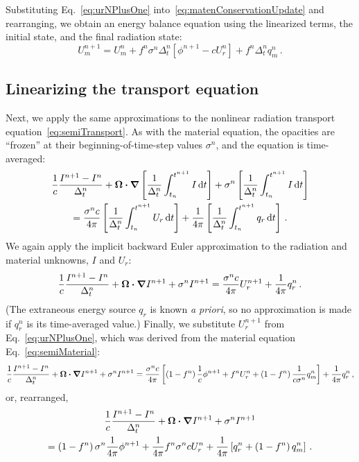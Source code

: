 Substituting Eq.~\eqref{eq:urNPlusOne} into~\eqref{eq:matenConservationUpdate}
and rearranging, we obtain an energy balance equation using the linearized
terms, the initial state, and the final radiation state:
\begin{equation}\label{eq:matenConservationUpdate2}
  U_m^{n+1} = U_m^n + f^n \sigma^n \Delta_t^n
  \left[ \phi^{n+1} - c U_r^n \right] + f^n \Delta_t^n q_m^n \,.
\end{equation}

\subsection{Linearizing the transport equation}
Next, we apply the same approximations to the nonlinear radiation
transport equation~\eqref{eq:semiTransport}. As with the material equation,
the
opacities are ``frozen'' at their beginning-of-time-step values $\sigma^n$, and
the equation is time-averaged:
\begin{multline*}
  \frac{1}{c} \frac{I^{n+1} - I^n}{\Delta_t^n}
  + \bm{\Omega} \bm{\cdot} \bm{\nabla} \left[
  \frac{1}{\Delta_t^n}\int_{t_n}^{t^{n+1}} I\mathop{}\!\mathrm{d} t
  \right] +
 \sigma^n \left[
  \frac{1}{\Delta_t^n}\int_{t_n}^{t^{n+1}} I\mathop{}\!\mathrm{d} t
  \right]
  \\
  = \frac{\sigma^n c}{4\pi} \left[
  \frac{1}{\Delta_t^n}\int_{t_n}^{t^{n+1}} U_r \mathop{}\!\mathrm{d} t \right]
  + \frac{1}{4\pi}\left[
  \frac{1}{\Delta_t^n}\int_{t_n}^{t^{n+1}} q_r \mathop{}\!\mathrm{d} t \right] \,.
\end{multline*}
We again apply the implicit backward Euler approximation
to the radiation and
material unknowns, $I$ and $U_r$:
\begin{equation*}
  \frac{1}{c} \frac{I^{n+1} - I^n}{\Delta_t^n}
  + \bm{\Omega} \bm{\cdot} \bm{\nabla} I^{n+1}
 + \sigma^n I^{n+1}
 = \frac{\sigma^n c}{4\pi} U_r^{n+1}
  + \frac{1}{4\pi} q_r^n \,.
\end{equation*}
(The extraneous energy source $q_r$ is known \emph{a priori}, so no
approximation is made if $q_r^n$ is its time-averaged value.)
Finally, we substitute $U_r^{n+1}$ from Eq.~\eqref{eq:urNPlusOne},
which was derived from the material equation Eq.~\eqref{eq:semiMaterial}:
\begin{equation*}
  \frac{1}{c} \frac{I^{n+1} - I^n}{\Delta_t^n}
  + \bm{\Omega} \bm{\cdot} \bm{\nabla} I^{n+1}
 + \sigma^n I^{n+1}
 = \frac{\sigma^n c}{4\pi} \left[ \left(1 - f^n\right) \frac1c \phi^{n+1}
   + f^n U_r^n
   + \left(1 - f^n\right)\frac{1}{c \sigma^n} q_m^n \right]
  + \frac{1}{4\pi} q_r^n\,,
\end{equation*}
or, rearranged,
\begin{multline}\label{eq:linearizedGrayTransport}
  \frac{1}{c} \frac{I^{n+1} - I^n}{\Delta_t^n}
  + \bm{\Omega} \bm{\cdot} \bm{\nabla} I^{n+1}
 + \sigma^n I^{n+1}
 \\
 =  \left(1 - f^n\right) \sigma^n \frac{1}{4\pi} \phi^{n+1}
 + \frac{1}{4\pi} f^n \sigma^n c U_r^n
 + \frac{1}{4\pi} \left[ q_r^n + \left(1 - f^n\right) q_m^n \right] \,.
\end{multline}

